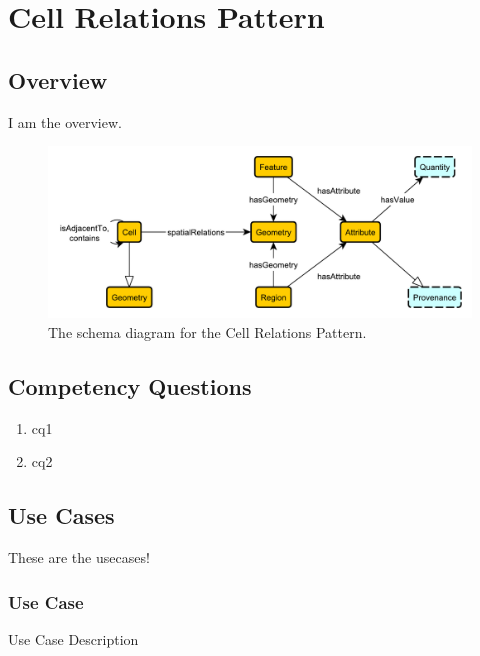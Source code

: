 
\section{Cell Relations Pattern}
\label{sec:cell-relations-pattern}
\subsection{Overview}
\label{ssec:overview}
I am the overview.

\begin{figure}[h!]
  \begin{center}
    \includegraphics[width=\textwidth]{resources/cell-relations-pattern.pdf}
  \end{center}
  \caption{The schema diagram for the Cell Relations Pattern.}
  \label{fig:ov-diagram}
\end{figure}


\subsection{Competency Questions}
\label{ssec:cqs}
\begin{enumerate}[\phantom{CQ }CQ 1.]
	\item cq1
	\item cq2
\end{enumerate}

\subsection{Use Cases}
\label{ssec:use-cases}
These are the usecases!

\subsubsection{Use Case
}
Use Case Description

